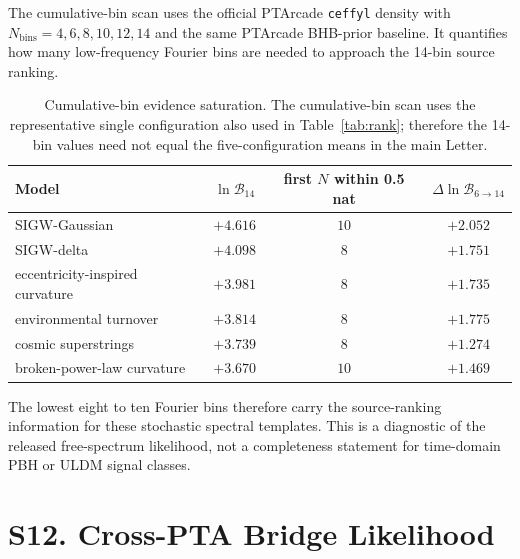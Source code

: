 \documentclass[aps,prl,superscriptaddress,nofootinbib]{revtex4-2}
\begin{document}
The cumulative-bin scan uses the official PTArcade \texttt{ceffyl} density
with $N_\mathrm{bins}=4,6,8,10,12,14$ and the same PTArcade BHB-prior
baseline.  It quantifies how many low-frequency Fourier bins are needed to
approach the 14-bin source ranking.

\begin{table}[H]
\caption{\label{tab:bins}Cumulative-bin evidence saturation.  The cumulative-bin
scan uses the representative single configuration also used in
Table~\ref{tab:rank}; therefore the 14-bin values need not equal the
five-configuration means in the main Letter.}
\begin{ruledtabular}
\begin{tabular}{lccc}
Model & $\ln\mathcal{B}_{14}$ & first $N$ within 0.5 nat & $\Delta\ln\mathcal{B}_{6\to14}$ \\
\hline
SIGW-Gaussian & $+4.616$ & $10$ & $+2.052$ \\
SIGW-delta & $+4.098$ & $8$ & $+1.751$ \\
eccentricity-inspired curvature & $+3.981$ & $8$ & $+1.735$ \\
environmental turnover & $+3.814$ & $8$ & $+1.775$ \\
cosmic superstrings & $+3.739$ & $8$ & $+1.274$ \\
broken-power-law curvature & $+3.670$ & $10$ & $+1.469$ \\
\end{tabular}
\end{ruledtabular}
\end{table}

The lowest eight to ten Fourier bins therefore carry the source-ranking
information for these stochastic spectral templates.  This is a diagnostic of
the released free-spectrum likelihood, not a completeness statement for
time-domain PBH or ULDM signal classes.

\section*{S12. Cross-PTA Bridge Likelihood}
\end{document}
